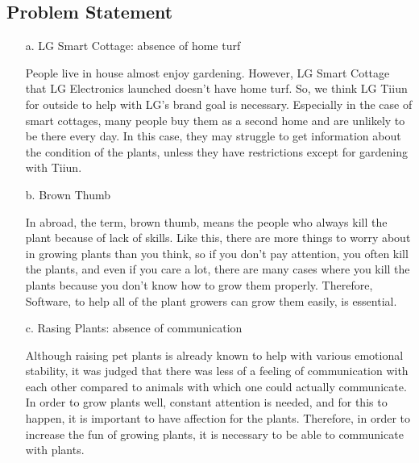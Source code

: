 \documentclass[conference, a4paper]{IEEEtran}
\begin{document}
\subsection{Problem Statement}
\begin{enumerate}
    \item[a.]LG Smart Cottage: absence of home turf
    \item[] People live in house almost enjoy gardening. However, LG Smart Cottage that LG Electronics launched doesn’t have home turf. So, we think LG Tiiun for outside to help with LG’s brand goal is necessary. Especially in the case of smart cottages, many people buy them as a second home and are unlikely to be there every day. In this case, they may struggle to get information about the condition of the plants, unless they have restrictions except for gardening with Tiiun.\\
    \item[b.]Brown Thumb
    \item[] In abroad, the term, brown thumb, means the people who always kill the plant because of lack of skills. Like this, there are more things to worry about in growing plants than you think, so if you don't pay attention, you often kill the plants, and even if you care a lot, there are many cases where you kill the plants because you don't know how to grow them properly. Therefore, Software, to help all of the plant growers can grow them easily, is essential. \\
    \item[c.]Rasing Plants: absence of communication
    \item[] Although raising pet plants is already known to help with various emotional stability, it was judged that there was less of a feeling of communication with each other compared to animals with which one could actually communicate. In order to grow plants well, constant attention is needed, and for this to happen, it is important to have affection for the plants. Therefore, in order to increase the fun of growing plants, it is necessary to be able to communicate with plants. \\
\end{enumerate}
\end{document}
